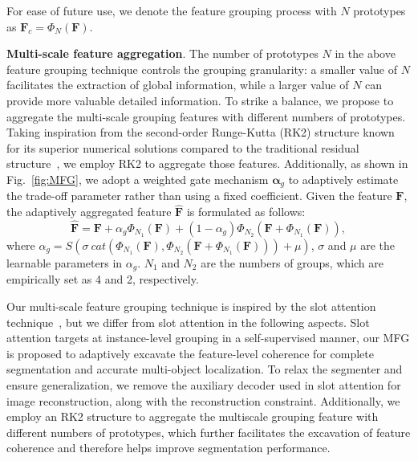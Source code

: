 For ease of future use, we denote the feature grouping process with $N$ prototypes as $\mathbf{F}_c= \Phi_N(\mathbf{F})$.

\noindent\textbf{Multi-scale feature aggregation}. 
The number of prototypes $N$ in the above feature grouping technique controls the grouping granularity: a smaller value of $N$ facilitates the extraction of global information, while a larger value of $N$ can provide more valuable detailed information. To strike a balance, we propose to aggregate the multi-scale grouping features with different numbers of prototypes. Taking inspiration from the second-order Runge-Kutta (RK2) structure known for its superior numerical solutions compared to the traditional residual structure~\cite{he2016deep}, we employ RK2 to aggregate those features. Additionally, as shown in Fig.~\ref{fig:MFG}, we adopt a weighted gate mechanism $\mathbf{\alpha}_g$ to adaptively estimate the trade-off parameter rather than using a fixed coefficient. Given the feature $\mathbf{F}$, the adaptively aggregated feature $\hat{\mathbf{F}}$ is formulated as follows:
\begin{equation}
    \hat{\mathbf{F}} = \mathbf{F} +\alpha_g \Phi_{N_1}(\mathbf{F}) +(1-\alpha_g) \Phi_{N_2}(\mathbf{F}+\Phi_{N_1}(\mathbf{F})), %
\end{equation}
where $\alpha_g=S(\sigma \ cat(\Phi_{N_1}(\mathbf{F}), \Phi_{N_2}(\mathbf{F}+\Phi_{N_1}(\mathbf{F})))+\mu)$, $\sigma$ and $\mu$ are the learnable parameters in $\alpha_g$. $N_1$ and $N_2$ are the numbers of groups, which are empirically set as 4 and 2, respectively. 

Our multi-scale feature grouping technique is inspired by the slot attention technique~\cite{locatello2020object}, but we differ from slot attention in the following aspects. Slot attention targets at instance-level grouping in a self-supervised manner, our MFG is proposed to adaptively excavate the feature-level coherence for complete segmentation and accurate multi-object localization. To relax the segmenter and ensure generalization, we remove the auxiliary decoder used in slot attention for image reconstruction, along with the reconstruction constraint. Additionally, we employ an RK2 structure to aggregate the multiscale grouping feature with different numbers of prototypes, which further facilitates the excavation of feature coherence and therefore helps improve segmentation performance.

